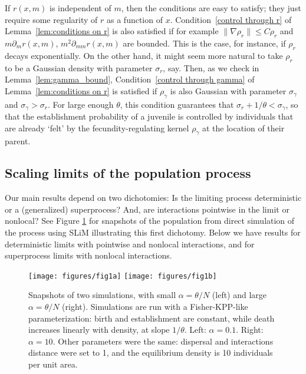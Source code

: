 \documentclass[EJP]{ejpecp} %
\newcommand{\citep}[1]{\cite{#1}}
\begin{document}
If $r(x,m)$ is independent of $m$, then the conditions are easy to 
satisfy; they just require some regularity of $r$ as a function of $x$. 
Condition~\ref{control through r} of Lemma~\ref{lem:conditions on r} is also satisfied if for example
$\|\nabla\rho_r\|\leq C\rho_r$ 
and $m\partial_mr(x,m)$, $m^2\partial_{mm}r(x,m)$ are bounded.
This is the case, for instance, if $\rho_r$ decays exponentially.
On the other hand, it might seem more natural to take $\rho_r$ to be a Gaussian 
density with parameter $\sigma_r$, say. Then, 
as we check in Lemma~\ref{lem:gamma_bound},
Condition~\ref{control through gamma} of Lemma~\ref{lem:conditions on r}
is satisfied if $\rho_\gamma$ is also
Gaussian with parameter $\sigma_\gamma$ and $\sigma_\gamma>\sigma_r$. For large enough
$\theta$, this condition guarantees that 
$\sigma_r+1/\theta <\sigma_\gamma$, so that the establishment probability of a juvenile
is controlled by individuals that are already `felt' by the fecundity-regulating kernel $\rho_\gamma$
at the location of their parent. 


\subsection{Scaling limits of the population process}

Our main results depend on two dichotomies:
Is the limiting process deterministic or a (generalized) superprocess?
And, are interactions pointwise in the limit or nonlocal?
See Figure \ref{fig:super_vs_det_2d} for snapshots of the population
from direct simulation of the process using SLiM \citep{haller_slim_2019}
illustrating this first dichotomy.
Below we have results for deterministic limits with pointwise and nonlocal interactions,
and for superprocess limits with nonlocal interactions.


\begin{figure}
    \begin{center}
        \texttt{[image: figures/fig1a]}
        \texttt{[image: figures/fig1b]}
    \end{center}
    \caption{
        Snapshots of two simulations, with small $\alpha=\theta/N$ (left) and large 
	$\alpha =\theta/N$ (right).
        Simulations are run with a Fisher-KPP-like parameterization:
        birth and establishment are constant, while death increases linearly with density,
        at slope $1/\theta$.
        Left: $\alpha=0.1$. Right: $\alpha=10$.
        Other parameters were the same:
        dispersal and interactions distance were set to 1,
        and the equilibrium density is 10 individuals per unit area.
        \label{fig:super_vs_det_2d}
    }
\end{figure}
\end{document}
